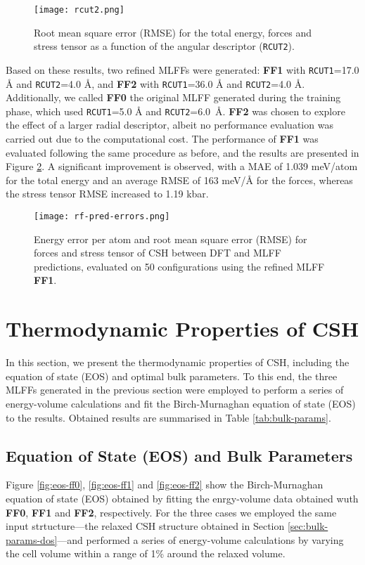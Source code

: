 \begin{figure}[h]
    \centering
    \texttt{[image: rcut2.png]}
    \caption{
    Root mean square error (RMSE) for the total energy, forces and stress tensor as a function of the angular descriptor (\texttt{RCUT2}).
    }
    \label{rcut2}
\end{figure}

Based on these results, two refined MLFFs were generated: \textbf{FF1} with \texttt{RCUT1}=17.0 Å and \texttt{RCUT2}=4.0 Å, and \textbf{FF2} with \texttt{RCUT1}=36.0 Å and \texttt{RCUT2}=4.0 Å. Additionally, we called \textbf{FF0} the original MLFF generated during the training phase, which used \texttt{RCUT1}=5.0 Å and \texttt{RCUT2}=6.0~Å. \textbf{FF2} was chosen to explore the effect of a larger radial descriptor, albeit no performance evaluation was carried out due to the computational cost. 
The performance of \textbf{FF1} was evaluated following the same procedure as before, and the results are presented in Figure \ref{rf-pred-errors}. A significant improvement is observed, with a MAE of  1.039 meV/atom for the total energy and an average RMSE of 163 meV/Å for the forces, whereas the stress tensor RMSE increased to 1.19 kbar.
\begin{figure}[h]
    \centering
    \texttt{[image: rf-pred-errors.png]}
    \caption{
    Energy error per atom and root mean square error (RMSE) for forces and stress tensor of CSH between DFT and MLFF predictions, evaluated on 50 configurations using the refined MLFF \textbf{FF1}.  
    }
    \label{rf-pred-errors}
\end{figure}
\section{Thermodynamic Properties of CSH}
\label{sec:thermo-properties}
In this section, we present the thermodynamic properties of CSH, including the equation of state (EOS) and optimal bulk parameters. To this end, the three MLFFs generated in the previous section were employed to perform a series of energy-volume calculations and fit the Birch-Murnaghan equation of state (EOS) to the results. Obtained results are summarised in Table \ref{tab:bulk-params}.

\subsection{Equation of State (EOS) and Bulk Parameters}
Figure \ref{fig:eos-ff0}, \ref{fig:eos-ff1} and \ref{fig:eos-ff2} show the Birch-Murnaghan equation of state (EOS) obtained by fitting the enrgy-volume data obtained wuth \textbf{FF0}, \textbf{FF1} and \textbf{FF2}, respectively.  For the three cases we employed the same input strtucture---the relaxed CSH structure obtained in Section \ref{sec:bulk-params-dos}---and performed a series of energy-volume calculations by varying the cell volume within a range of 1\% around the relaxed volume. 


